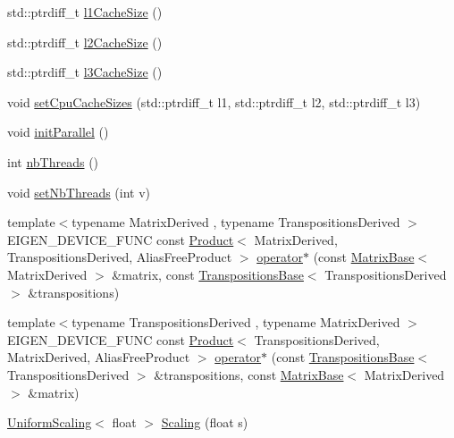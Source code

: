 \begin{DoxyCompactItemize}
\item 
std\+::ptrdiff\+\_\+t \hyperlink{namespace_eigen_a2669f89ff38296a38e6d973552eb4e33}{l1\+Cache\+Size} ()
\item 
std\+::ptrdiff\+\_\+t \hyperlink{namespace_eigen_a2cfc0330ba567d63a496be1cac8427ae}{l2\+Cache\+Size} ()
\item 
std\+::ptrdiff\+\_\+t \hyperlink{namespace_eigen_ae2efa4852ea90c2d47b7dcec5b40ba2b}{l3\+Cache\+Size} ()
\item 
void \hyperlink{namespace_eigen_ae64421554aa0a4bf9258bafe3170102b}{set\+Cpu\+Cache\+Sizes} (std\+::ptrdiff\+\_\+t l1, std\+::ptrdiff\+\_\+t l2, std\+::ptrdiff\+\_\+t l3)
\item 
void \hyperlink{namespace_eigen_a820c0e0460934cc17eb6dacbad54a9f5}{init\+Parallel} ()
\item 
int \hyperlink{namespace_eigen_a9aca97d83e21b91a04ec079360dfffeb}{nb\+Threads} ()
\item 
void \hyperlink{namespace_eigen_af9cd17c2fe18204239cd11c88c120b50}{set\+Nb\+Threads} (int v)
\item 
{\footnotesize template$<$typename Matrix\+Derived , typename Transpositions\+Derived $>$ }\\E\+I\+G\+E\+N\+\_\+\+D\+E\+V\+I\+C\+E\+\_\+\+F\+U\+NC const \hyperlink{group___core___module_class_eigen_1_1_product}{Product}$<$ Matrix\+Derived, Transpositions\+Derived, Alias\+Free\+Product $>$ \hyperlink{namespace_eigen_a8b493da0816bfa75429961b75f21d780}{operator$\ast$} (const \hyperlink{group___core___module_class_eigen_1_1_matrix_base}{Matrix\+Base}$<$ Matrix\+Derived $>$ \&matrix, const \hyperlink{class_eigen_1_1_transpositions_base}{Transpositions\+Base}$<$ Transpositions\+Derived $>$ \&transpositions)
\item 
{\footnotesize template$<$typename Transpositions\+Derived , typename Matrix\+Derived $>$ }\\E\+I\+G\+E\+N\+\_\+\+D\+E\+V\+I\+C\+E\+\_\+\+F\+U\+NC const \hyperlink{group___core___module_class_eigen_1_1_product}{Product}$<$ Transpositions\+Derived, Matrix\+Derived, Alias\+Free\+Product $>$ \hyperlink{namespace_eigen_a4c63a9e3b8c513835a3b5551d98bd0c3}{operator$\ast$} (const \hyperlink{class_eigen_1_1_transpositions_base}{Transpositions\+Base}$<$ Transpositions\+Derived $>$ \&transpositions, const \hyperlink{group___core___module_class_eigen_1_1_matrix_base}{Matrix\+Base}$<$ Matrix\+Derived $>$ \&matrix)
\item 
\hyperlink{class_eigen_1_1_uniform_scaling}{Uniform\+Scaling}$<$ float $>$ \hyperlink{group___geometry___module_ga23a8ed57e3f2973526026765ae697761}{Scaling} (float s)

\end{DoxyCompactItemize}
